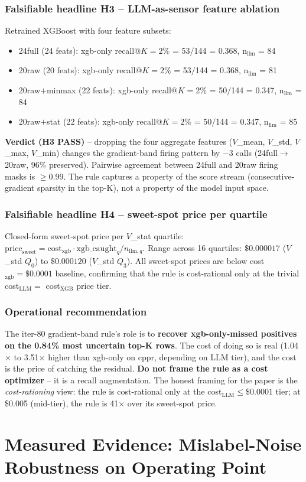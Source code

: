 \documentclass{article}
\begin{document}
\subsubsection{Falsifiable headline H3 -- LLM-as-sensor feature ablation}
Retrained XGBoost with four feature subsets:
\begin{itemize}
\item 24full (24 feats): xgb-only recall$@K{=}2\%$ = 53$/$144 = 0.368, n$_{\text{llm}}$ = 84
\item 20raw (20 feats): xgb-only recall$@K{=}2\%$ = 53$/$144 = 0.368, n$_{\text{llm}}$ = 81
\item 20raw$+$minmax (22 feats): xgb-only recall$@K{=}2\%$ = 50$/$144 = 0.347, n$_{\text{llm}}$ = 84
\item 20raw$+$stat (22 feats): xgb-only recall$@K{=}2\%$ = 50$/$144 = 0.347, n$_{\text{llm}}$ = 85
\end{itemize}
\textbf{Verdict (H3 PASS)} -- dropping the four aggregate features
($V$\_mean, $V$\_std, $V$\_max, $V$\_min) changes the gradient-band firing
pattern by $-3$ calls (24full$\to$20raw, 96\% preserved). Pairwise
agreement between 24full and 20raw firing masks is $\geq$0.99.
The rule captures a property of the score stream
(consecutive-gradient sparsity in the top-K), not a property of the
model input space.

\subsubsection{Falsifiable headline H4 -- sweet-spot price per quartile}
Closed-form sweet-spot price per $V$\_stat quartile:
$\text{price}_{\text{sweet}} = \text{cost}_{\text{xgb}} \cdot
\text{xgb\_caught}_{q} / n_{\text{llm},q}$.  Range across 16 quartiles:
$\$0.000017$ ($V$\_std $Q_0$) to $\$0.000120$ ($V$\_std $Q_3$).
All sweet-spot prices are below cost$_{\text{xgb}} = \$0.0001$ baseline,
confirming that the rule is cost-rational only at the trivial
cost$_{\text{LLM}} =$ cost$_{\text{XGB}}$ price tier.

\subsubsection{Operational recommendation}
The iter-80 gradient-band rule's role is to \textbf{recover xgb-only-missed
positives on the 0.84\% most uncertain top-K rows}.  The cost of doing so
is real (1.04$\times$ to 3.51$\times$ higher than xgb-only on cppr,
depending on LLM tier), and the cost is the price of catching the residual.
\textbf{Do not frame the rule as a cost optimizer} -- it is a recall
augmentation.  The honest framing for the paper is the
\emph{cost-rationing} view: the rule is cost-rational only at the
cost$_{\text{LLM}} \leq \$0.0001$ tier; at \$0.005 (mid-tier), the rule
is 41$\times$ over its sweet-spot price. \section{Measured Evidence: Mislabel-Noise Robustness on Operating Point}
\label{sec:p8-mislabel}
\end{document}
